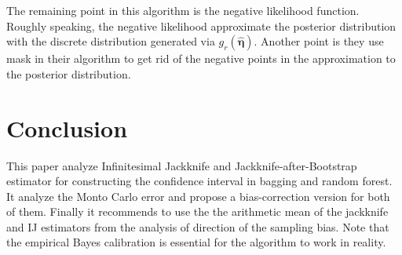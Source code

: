 \documentclass[11pt]{article}
\begin{document}
The remaining point in this algorithm is the negative likelihood function. 
Roughly speaking, the negative likelihood approximate the posterior distribution with the discrete distribution generated via $g_{r}(\hat{\boldsymbol{\eta}})$.
Another point is they use mask in their algorithm to get rid  of the negative points in the approximation to the posterior distribution.
	
\section{Conclusion}
This paper analyze Infinitesimal Jackknife and Jackknife-after-Bootstrap estimator for constructing the confidence interval in bagging and random forest.
It analyze the Monto Carlo error and propose a bias-correction version for both of them. 
Finally it recommends to use the the arithmetic mean of the jackknife and IJ estimators from the analysis of direction of the sampling bias.
Note that the empirical Bayes calibration is essential for the algorithm to work in reality.
\end{document}
